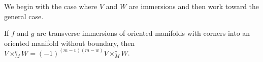\begin{comment}
	is already contained in the construction of the co-oriented fiber product, where $V\times^c_MW$ can be considered to be contained in $V \times W \times \R^N$.
	Explicitly we constructed $P = (g \times \id_{\R^N})^{-1}(e(V))$, but as $e$ is an embedding, the $V$ factor of points in $P$ is implicitly determined by $(w,z) \in P \subset W \times \R^N$ as $e^{-1}((g(w),z))$.
	So $P = (g \times \id_{\R^N})^{-1}(e(V))$ is canonically identified with $\{(v,w,z) \in V \times W \times \R^N \mid e(v) = (g(w),z)\}$.
	And as $e$ is part of a Quillen co-orientation, by projecting $M \times \R^N$ to $M$, we have of course $g(w) = f(v)$, so there is a canonical map $\{(v,w,z) \in V \times W \times \R^N \mid e(v) \to \{(v,w) \in V \times W \mid f(v) = g(w)\}$ given by projection to the first two factors.
	This is a diffeomorphism, whose inverse takes $(v,w)$ to $(v,w,z)$ such that $e(v) = (g(w),z)$.

	\red{Put some of this as a remark in the section where pullback of co-orientation is defined.}

	\medskip
\end{comment}

\medskip

We begin with the case where $V$ and $W$ are immersions and then work toward the general case.

\begin{lemma}\label{L: compare cup and intersection for immersions}
	If $f$ and $g$ are transverse immersions of oriented manifolds with corners into an oriented manifold without boundary, then $V \times_M ^oW = (-1)^{(m-v)(m-w)} V \times_M ^cW$.
\end{lemma}

